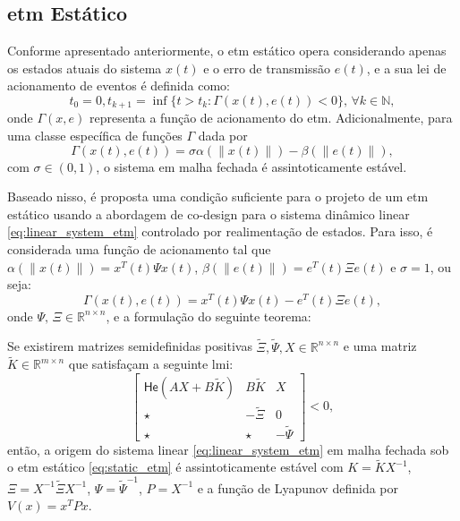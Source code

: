 
\subsection{\acrshort{etm} Estático}

Conforme apresentado anteriormente, o \acrshort{etm} estático opera considerando apenas os estados atuais do sistema $x(t)$ e o erro de transmissão $e(t)$, e a sua lei de acionamento de eventos é definida como: \begin{equation} t_0 = 0, t_{k+1} = \inf \{t > t_k : \Gamma(x(t), e(t)) < 0 \}, \, \forall k \in \mathbb{N}, \label{eq:static_etm}\end{equation} onde $\Gamma(x, e)$ representa a função de acionamento do \acrshort{etm}. Adicionalmente, para uma classe específica de funções $\Gamma$ dada por \begin{equation}
  \Gamma(x(t), e(t)) = \sigma \alpha(\|x(t)\|) - \beta(\|e(t)\|),
\end{equation} com $\sigma \in (0,1)$, o sistema em malha fechada é assintoticamente estável.

Baseado nisso, é proposta uma condição suficiente para o projeto de um \acrshort{etm} estático usando a abordagem de co-design para o sistema dinâmico linear \eqref{eq:linear_system_etm} controlado por realimentação de estados. Para isso, é considerada uma função de acionamento tal que $\alpha(\|x(t)\|) = x^T(t)\Psi x(t)$, $\beta(\|e(t)\|) = e^T(t)\Xi e(t)$ e $\sigma = 1$, ou seja:  \begin{equation}
  \Gamma(x(t), e(t)) = x^T(t)\Psi x(t) - e^T(t)\Xi e(t),
  \label{eq:etm_gamma}
\end{equation}  onde $\Psi, \, \Xi \in \mathbb{R}^{n \times n}$, e a formulação do seguinte teorema:

\begin{theorem}
  \label{theorem:etm_stability}
  Se existirem matrizes semidefinidas positivas $\tilde{\Xi}, \tilde{\Psi}, X \in \mathbb{R}^{n \times n}$ e uma matriz $\tilde{K} \in \mathbb{R}^{m \times n}$ que satisfaçam a seguinte \acrshort{lmi}:
  \begin{equation}
    \begin{bmatrix}
      \mathsf{He}(AX +B\tilde{K}) & B\tilde{K}   & X             \\
      \star                       & -\tilde{\Xi} & 0             \\
      \star                       & \star        & -\tilde{\Psi}
    \end{bmatrix} < 0,
    \label{eq:etm_lmi_1}
  \end{equation}
  então, a origem do sistema linear \eqref{eq:linear_system_etm} em malha fechada sob o \acrshort{etm} estático \eqref{eq:static_etm} é assintoticamente estável com $K = \tilde{K}X^{-1}$, $\Xi= X^{-1}\tilde{\Xi}X^{-1}$, $\Psi = \tilde{\Psi}^{-1}$, $P = X^{-1}$ e a função de Lyapunov definida por $V(x)=x^TPx$.
\end{theorem}

